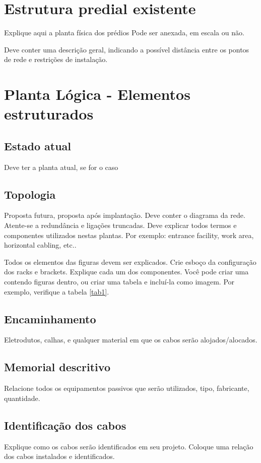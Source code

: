 \documentclass[	DIV=calc,%
							paper=a4,%
							fontsize=12pt,%
							onecolumn]{scrartcl}	 					%
\begin{document}
\section{Estrutura predial existente}

Explique aqui a planta física dos prédios
Pode ser anexada, em escala ou não.

Deve conter uma descrição geral, indicando a possível distância entre os pontos de rede e restrições de instalação.

\section{Planta Lógica - Elementos estruturados}

\subsection{Estado atual}
Deve ter a planta atual, se for o caso

\subsection{Topologia}
Proposta futura, proposta após implantação.
Deve conter o diagrama da rede. Atente-se a redundância  e ligações truncadas.
Deve explicar todos termos e componentes utilizados nestas plantas. Por exemplo: entrance facility, work area, horizontal cabling, etc..

Todos os elementos das figuras devem ser explicados. 
Crie esboço da configuração dos racks e brackets. Explique cada um dos componentes. Você pode criar uma 
 contendo figuras dentro, ou criar uma tabela e incluí-la como imagem. Por exemplo, verifique a tabela \ref{tab1}.



\subsection{Encaminhamento}
Eletrodutos, calhas, e qualquer material em que os cabos serão alojados/alocados.

\subsection{Memorial descritivo}

Relacione todos os equipamentos passivos que serão utilizados, tipo, fabricante, quantidade.

\subsection{Identificação dos cabos}
Explique como os cabos serão identificados em seu projeto. Coloque uma relação dos cabos instalados e identificados.
\end{document}
